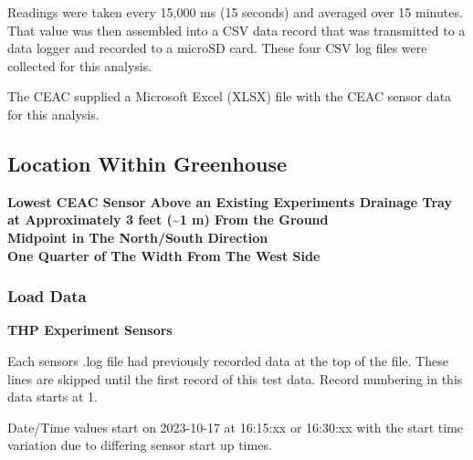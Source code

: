 \documentclass[
  letterpaper,
  DIV=11,
  numbers=noendperiod]{scrartcl}
\begin{document}
Readings were taken every 15,000 ms (15 seconds) and averaged over 15
minutes. That value was then assembled into a CSV data record that was
transmitted to a data logger and recorded to a microSD card. These four
CSV log files were collected for this analysis.

The CEAC supplied a Microsoft Excel (XLSX) file with the CEAC sensor
data for this analysis.

\hypertarget{location-within-greenhouse}{%
\subsection{Location Within
Greenhouse}\label{location-within-greenhouse}}

\textbf{Lowest CEAC Sensor Above an Existing Experiments Drainage Tray
at Approximately 3 feet (\textasciitilde1 m) From the Ground}\\
\textbf{Midpoint in The North/South Direction}\\
\textbf{One Quarter of The Width From The West Side}

\hypertarget{load-data}{%
\subsubsection{Load Data}\label{load-data}}

\textbf{THP Experiment Sensors}

Each sensors .log file had previously recorded data at the top of the
file. These lines are skipped until the first record of this test data.
Record numbering in this data starts at 1.

Date/Time values start on 2023-10-17 at 16:15:xx or 16:30:xx with the
start time variation due to differing sensor start up times.
\end{document}
